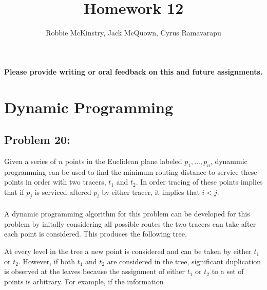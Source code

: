 \documentclass[12pt]{article}
\begin{document}
\title{Homework 12}
\author{Robbie McKinstry, Jack McQuown, Cyrus Ramavarapu}
\renewcommand{\today}{30 September 2016}
\renewcommand{\baselinestretch}{1.5}
\maketitle

\textbf{Please provide writing or oral feedback on this and future assignments.}

\section*{Dynamic Programming}
\subsection*{Problem 20: }
Given a series of $n$ points in the Euclidean plane labeled
$p_1,\dots,p_n$, dynammic programming can be used to find the 
minimum routing distance to service these points in order
with two tracers, $t_1$ and $t_2$.  In order tracing of these points
implies that if $p_j$ is serviced aftered $p_i$ by either tracer, it 
implies that $i<j$.\\\\
A dynamic programming algorithm for this problem can be
developed for this problem by initally considering all possible
routes the two tracers can take after each point is considered. 
This produces the following tree.
\begin{center}
\end{center} 
At every level in the tree a new point is considered and can be
taken by either $t_1$ or $t_2$.  However, if both $t_1$ and $t_2$
are considered in the tree, significant duplication is observed
at the leaves because the assignment of either $t_1$ or $t_2$ to
a set of points is arbitrary.  For example, if the information
\end{document}
